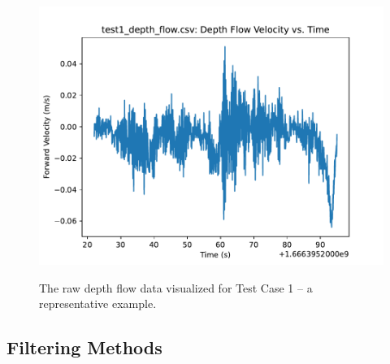 \begin{figure}
	\centering
		\centering
		\includegraphics[width=\linewidth]{./images/test1_depth_flow_depth_forward_velocity.pdf}
		\label{figure:test1_depth_flow}
	\caption{The raw depth flow data visualized for Test Case 1 -- a representative example.}
	\label{figure:depth_flow123_raw}
\end{figure}

\subsection{Filtering Methods}

